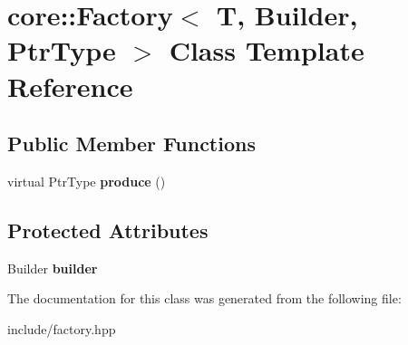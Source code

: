 \hypertarget{classcore_1_1_factory}{\section{core\-:\-:Factory$<$ T, Builder, Ptr\-Type $>$ Class Template Reference}
\label{classcore_1_1_factory}
}
\subsection*{Public Member Functions}
\begin{DoxyCompactItemize}
\item 
\hypertarget{classcore_1_1_factory_afd99ae6b71b492f2a510b906bfb87244}{virtual Ptr\-Type {\bfseries produce} ()}\label{classcore_1_1_factory_afd99ae6b71b492f2a510b906bfb87244}

\end{DoxyCompactItemize}
\subsection*{Protected Attributes}
\begin{DoxyCompactItemize}
\item 
\hypertarget{classcore_1_1_factory_aad9a82c7a09eec4cea0e850e80b3bf7a}{Builder {\bfseries builder}}\label{classcore_1_1_factory_aad9a82c7a09eec4cea0e850e80b3bf7a}

\end{DoxyCompactItemize}


The documentation for this class was generated from the following file\-:\begin{DoxyCompactItemize}
\item 
include/factory.\-hpp\end{DoxyCompactItemize}
